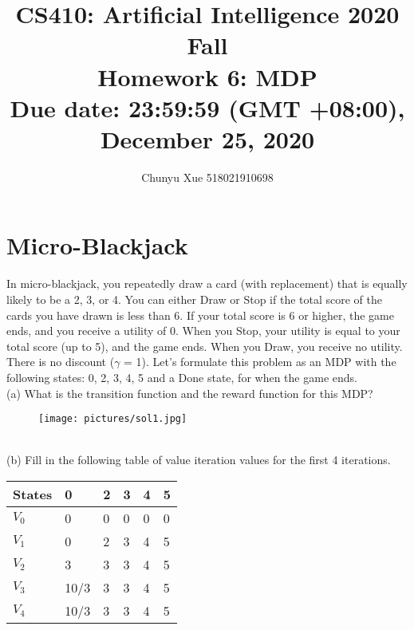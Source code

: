 \documentclass{article}
\title{\normalsize
CS410: Artificial Intelligence 2020 Fall\\
Homework 6: MDP\\
Due date: 23:59:59 (GMT +08:00), December 25, 2020}
\author{Chunyu Xue 518021910698}
\date{}
\begin{document}
 
\maketitle

\section{Micro-Blackjack}
\noindent In micro-blackjack, you repeatedly draw a card (with replacement) that is equally likely to be a 2, 3, or 4. You can either Draw or Stop if the total score of the cards you have drawn is less than 6. If your total score is 6 or higher, the game ends, and you receive a utility of 0. When you Stop, your utility is equal to your total score (up to 5), and the game ends. When you Draw, you receive no utility. There is no discount ($\gamma$ = 1). Let’s formulate this problem as an MDP with the following states: 0, 2, 3, 4, 5 and a Done state, for when the game ends.\\


\noindent (a) What is the transition function and the reward function for this MDP? \\

\begin{figure}[h]
\centering
\texttt{[image: pictures/sol1.jpg]}
\end{figure}

~\\

\noindent (b) Fill in the following table of value iteration values for the first 4 iterations. \\

\renewcommand\arraystretch{1.5}
\begin{table}[tbh!]
\begin{center}
    \begin{tabular}{|p{1cm}| p{1cm}| p{1cm} | p{1cm}| p{1cm}| p{1cm}|}
\hline 
States & 0 & 2 & 3 & 4 & 5  \\
\hline
$V_0$ & 0  & 0  &  0 &  0 & 0   \\
\hline  
$V_1$ &  0 &  2 & 3  & 4  & 5   \\
\hline 
$V_2$ & 3  & 3  & 3  & 4  & 5   \\
\hline 
$V_3$ & 10/3  & 3  & 3  &  4 &  5  \\
\hline
$V_4$ & 10/3  & 3  & 3  & 4  &  5  \\
\hline
\end{tabular}
\end{center}
\end{table}
\end{document}

